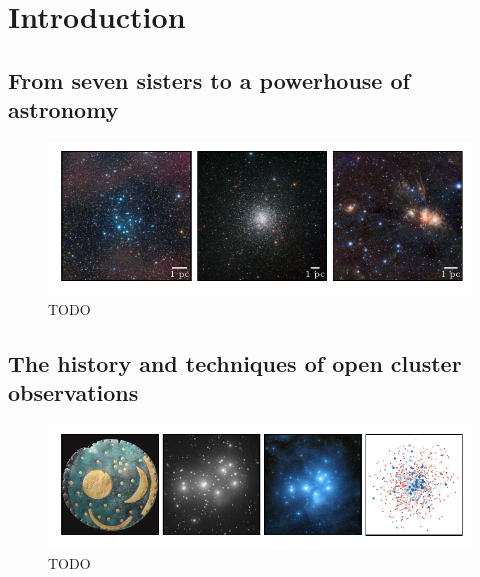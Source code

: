 %
\chapter{Introduction}
\label{sec:intro}


\section{From seven sisters to a powerhouse of astronomy}
\label{sec:intro:intro}

\begin{figure}[tb]
	\includegraphics[width=\textwidth]{fig/c1/oc_gc_mg_comparison.pdf}
	\caption{TODO}
	\label{fig:intro:intro:comparison}
\end{figure}


\section{The history and techniques of open cluster observations}
\label{sec:intro:history}

\blindtext

\begin{figure}[tb]
	\includegraphics[width=\textwidth]{fig/c1/pleiades.pdf}
	\caption{TODO}
	\label{fig:intro:history:pleiades}
\end{figure}

